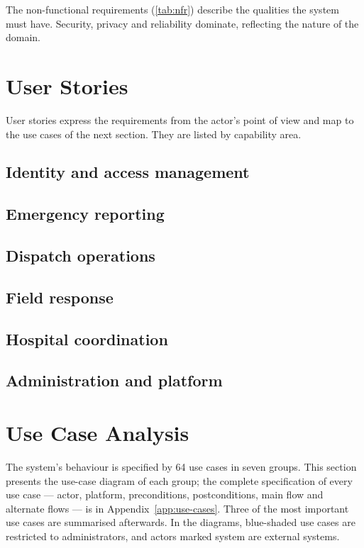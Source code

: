 The non-functional requirements (\cref{tab:nfr}) describe the qualities the system must have. Security,
privacy and reliability dominate, reflecting the nature of the domain.



\section{User Stories}

User stories express the requirements from the actor's point of view and map to the use cases of the next
section. They are listed by capability area.

\subsection{Identity and access management}
\subsection{Emergency reporting}
\subsection{Dispatch operations}
\subsection{Field response}
\subsection{Hospital coordination}
\subsection{Administration and platform}

\section{Use Case Analysis}\label{sec:usecases}

The system's behaviour is specified by 64 use cases in seven groups. This section presents the use-case diagram of
each group; the complete specification of every use case --- actor, platform, preconditions, postconditions, main
flow and alternate flows --- is in Appendix~\ref{app:use-cases}. Three of the most important use cases are summarised
afterwards. In the diagrams, blue-shaded use cases are restricted to administrators, and actors marked
\guillemotleft system\guillemotright{} are external systems.

